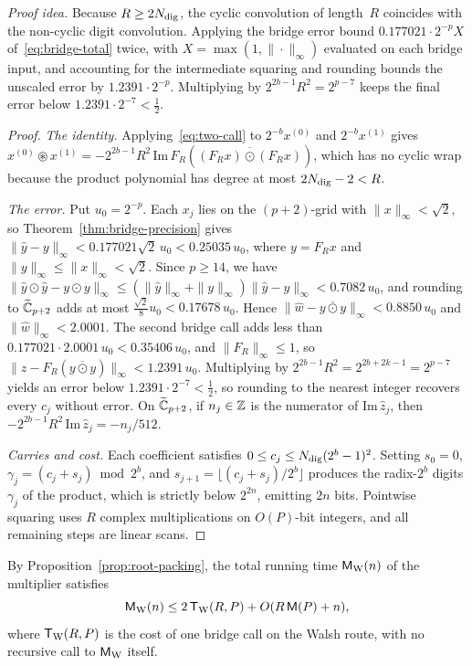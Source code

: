\emph{Proof idea.} Because $R\ge 2N_{\rm dig}$, the cyclic convolution of length~$R$ coincides with the non-cyclic digit
convolution. Applying the bridge error bound $0.177021\cdot 2^{-p}X$ of~\eqref{eq:bridge-total} twice, with
$X=\max(1,\|\cdot\|_\infty)$ evaluated on each bridge input, and accounting for the intermediate squaring and rounding
bounds the unscaled error by $1.2391\cdot 2^{-p}$. Multiplying by $2^{2b-1}R^2=2^{p-7}$ keeps the final error below
$1.2391\cdot 2^{-7}<\frac12$.

\begin{proof}
\emph{The identity.} Applying~\eqref{eq:two-call} to $2^{-b}x^{(0)}$ and $2^{-b}x^{(1)}$ gives
$x^{(0)}\circledast x^{(1)}=-2^{2b-1}R^2\,\allowbreak\mathrm{Im}\,\allowbreak F_R(\overline{(F_Rx)\odot(F_Rx)})$, which
has no cyclic wrap because the product polynomial has degree at most $2N_{\rm dig}-2<R$.

\emph{The error.} Put $u_0=2^{-p}$. Each $x_j$ lies on the $(p+2)$-grid with $\|x\|_\infty<\sqrt2$, so
Theorem~\ref{thm:bridge-precision} gives $\|\hat y-y\|_\infty<0.177021\sqrt2\,u_0<0.25035\,u_0$, where $y=F_Rx$ and
$\|y\|_\infty\le\|x\|_\infty<\sqrt2$. Since $p\ge14$, we have
$\|\hat y\odot\hat y-y\odot y\|_\infty\le(\|\hat y\|_\infty+\|y\|_\infty)\|\hat y-y\|_\infty<0.7082\,u_0$, and rounding
to $\widetilde{\mathbb{C}}_{p+2}$ adds at most $\frac{\sqrt2}{8}u_0<0.17678\,u_0$. Hence $\|\hat w-\overline{y\odot y}\|_\infty<0.8850\,u_0$
and $\|\hat w\|_\infty<2.0001$. The second bridge call adds less than $0.177021\cdot2.0001\,u_0<0.35406\,u_0$, and
$\|F_R\|_\infty\le1$, so $\|\hat z-F_R(\overline{y\odot y})\|_\infty<1.2391\,u_0$. Multiplying by
$2^{2b-1}R^2=2^{2b+2k-1}=2^{p-7}$ yields an error below $1.2391\cdot2^{-7}<\frac12$, so rounding to the nearest integer
recovers every $c_j$ without error. On $\widetilde{\mathbb{C}}_{p+2}$, if $n_j\in\mathbb{Z}$ is the numerator of $\mathrm{Im}\,\hat z_j$, then
$-2^{2b-1}R^2\,\mathrm{Im}\,\hat z_j=-n_j/512$.

\emph{Carries and cost.} Each coefficient satisfies $0\le c_j\le N_{\rm dig}(2^b-1)^2$. Setting $s_0=0$,
$\gamma_j=(c_j+s_j)\bmod2^b$, and $s_{j+1}=\lfloor(c_j+s_j)/2^b\rfloor$ produces the radix-$2^b$ digits $\gamma_j$ of
the product, which is strictly below $2^{2n}$, emitting $2n$ bits. Pointwise squaring uses $R$ complex multiplications
on $O(P)$-bit integers, and all remaining steps are linear scans.
\end{proof}

By Proposition~\ref{prop:root-packing}, the total running time $\mathsf M_{\rm W}(n)$ of the multiplier satisfies
\begin{equation}\label{eq:root-cost}
  \mathsf M_{\rm W}(n)\le2\,\mathsf T_{\rm W}(R,P)+O(R\,\mathsf M(P)+n),
\end{equation}
where $\mathsf T_{\rm W}(R,P)$ is the cost of one bridge call on the Walsh route, with no recursive call to
$\mathsf M_{\rm W}$ itself.


